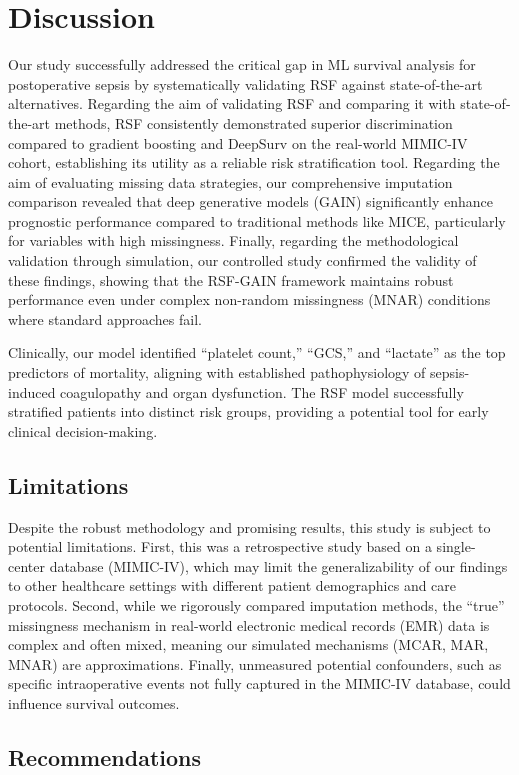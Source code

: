 \documentclass[pdflatex,sn-mathphys-num]{sn-jnl}%
\theoremstyle{thmstyleone}%
\theoremstyle{thmstyletwo}%
\theoremstyle{thmstylethree}%
\begin{document}
\section{Discussion}\label{sec12}
Our study successfully addressed the critical gap in ML survival analysis for postoperative sepsis by systematically validating RSF against state-of-the-art alternatives. Regarding the aim of validating RSF and comparing it with state-of-the-art methods, RSF consistently demonstrated superior discrimination compared to gradient boosting and DeepSurv on the real-world MIMIC-IV cohort, establishing its utility as a reliable risk stratification tool. Regarding the aim of evaluating missing data strategies, our comprehensive imputation comparison revealed that deep generative models (GAIN) significantly enhance prognostic performance compared to traditional methods like MICE, particularly for variables with high missingness. Finally, regarding the methodological validation through simulation, our controlled study confirmed the validity of these findings, showing that the RSF-GAIN framework maintains robust performance even under complex non-random missingness (MNAR) conditions where standard approaches fail.

Clinically, our model identified ``platelet count,'' ``GCS,'' and ``lactate'' as the top predictors of mortality, aligning with established pathophysiology of sepsis-induced coagulopathy and organ dysfunction. The RSF model successfully stratified patients into distinct risk groups, providing a potential tool for early clinical decision-making.

\subsection{Limitations}
Despite the robust methodology and promising results, this study is subject to potential limitations. First, this was a retrospective study based on a single-center database (MIMIC-IV), which may limit the generalizability of our findings to other healthcare settings with different patient demographics and care protocols. Second, while we rigorously compared imputation methods, the ``true'' missingness mechanism in real-world electronic medical records (EMR) data is complex and often mixed, meaning our simulated mechanisms (MCAR, MAR, MNAR) are approximations. Finally, unmeasured potential confounders, such as specific intraoperative events not fully captured in the MIMIC-IV database, could influence survival outcomes.

\subsection{Recommendations}
\end{document}
